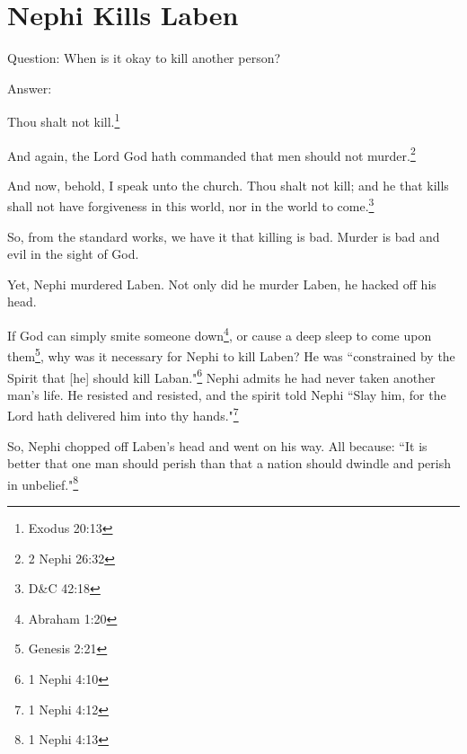 \chapter{Nephi Kills Laben}

Question: When is it okay to kill another person?

Answer:

\begin{displayquote}
Thou shalt not kill.\footnote{Exodus 20:13}
\end{displayquote}

\begin{displayquote}
And again, the Lord God hath commanded that men should not 
murder.\footnote{2 Nephi 26:32}
\end{displayquote}

\begin{displayquote}
And now, behold, I speak unto the church. Thou shalt not kill; 
and he that kills shall not have forgiveness in this world, nor in the 
world to come.\footnote{D\&C 42:18}
\end{displayquote}

So, from the standard works, we have it that killing is bad. Murder is bad and evil
in the sight of God.

Yet, Nephi murdered Laben. Not only did he murder Laben, he hacked off his head.

If God can simply smite someone down\footnote{Abraham 1:20}, or cause a deep sleep 
to come upon them\footnote{Genesis 2:21}, why was it necessary for Nephi to kill 
Laben? He was ``constrained by the Spirit that [he] should kill 
Laban."\footnote{1 Nephi 4:10} Nephi admits he had never taken
another man's life. He resisted and resisted, and the spirit told Nephi ``Slay him,
for the Lord hath delivered him into thy hands."\footnote{1 Nephi 4:12}

So, Nephi chopped off Laben's head and went on his way. All because: ``It is better
that one man should perish than that a nation should dwindle and perish in
unbelief."\footnote{1 Nephi 4:13}